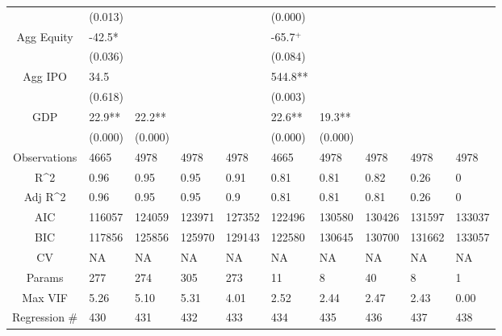 \documentclass{article}
\begin{document}
\begin{table}[H]
\begin{tabular}{|clllllllll|}
   & (0.013) &  &  &  & (0.000) &  &  &  &  \\ 
  Agg Equity & -42.5* &  &  &  & -65.7$^{+}$ &  &  &  &  \\ 
   & (0.036) &  &  &  & (0.084) &  &  &  &  \\ 
  Agg IPO & 34.5 &  &  &  & 544.8** &  &  &  &  \\ 
   & (0.618) &  &  &  & (0.003) &  &  &  &  \\ 
  GDP & 22.9** & 22.2** &  &  & 22.6** & 19.3** &  &  &  \\ 
   & (0.000) & (0.000) &  &  & (0.000) & (0.000) &  &  &  \\ 
  \hline 
 Observations & 4665 & 4978 & 4978 & 4978 & 4665 & 4978 & 4978 & 4978 & 4978 \\ 
  R^2 & 0.96 & 0.95 & 0.95 & 0.91 & 0.81 & 0.81 & 0.82 & 0.26 & 0 \\ 
  Adj R^2 & 0.96 & 0.95 & 0.95 & 0.9 & 0.81 & 0.81 & 0.81 & 0.26 & 0 \\ 
  AIC & 116057 & 124059 & 123971 & 127352 & 122496 & 130580 & 130426 & 131597 & 133037 \\ 
  BIC & 117856 & 125856 & 125970 & 129143 & 122580 & 130645 & 130700 & 131662 & 133057 \\ 
  CV & NA & NA & NA & NA & NA & NA & NA & NA & NA \\ 
  Params & 277 & 274 & 305 & 273 & 11 & 8 & 40 & 8 & 1 \\ 
  Max VIF & 5.26 & 5.10 & 5.31 & 4.01 & 2.52 & 2.44 & 2.47 & 2.43 & 0.00 \\ 
  Regression \# & 430 & 431 & 432 & 433 & 434 & 435 & 436 & 437 & 438 \\ 
   \hline
\end{tabular}
 
\end{table}
\end{document}
